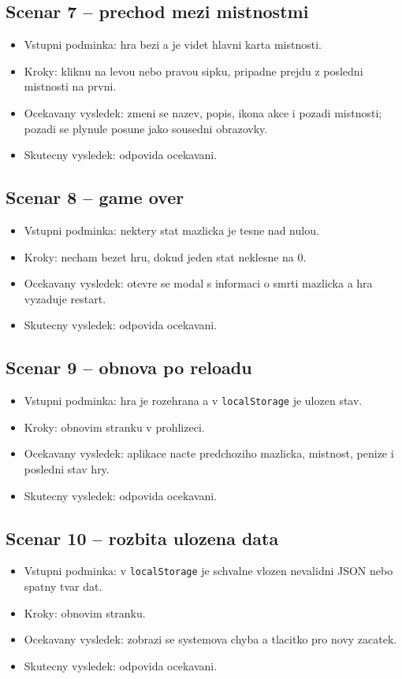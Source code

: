\documentclass[12pt,a4paper]{article}
\begin{document}
\subsection*{Scenar 7 -- prechod mezi mistnostmi}
\begin{itemize}[leftmargin=2em]
  \item Vstupni podminka: hra bezi a je videt hlavni karta mistnosti.
  \item Kroky: kliknu na levou nebo pravou sipku, pripadne prejdu z posledni mistnosti na prvni.
  \item Ocekavany vysledek: zmeni se nazev, popis, ikona akce i pozadi mistnosti; pozadi se plynule posune jako sousedni obrazovky.
  \item Skutecny vysledek: odpovida ocekavani.
\end{itemize}

\subsection*{Scenar 8 -- game over}
\begin{itemize}[leftmargin=2em]
  \item Vstupni podminka: nektery stat mazlicka je tesne nad nulou.
  \item Kroky: necham bezet hru, dokud jeden stat neklesne na 0.
  \item Ocekavany vysledek: otevre se modal s informaci o smrti mazlicka a hra vyzaduje restart.
  \item Skutecny vysledek: odpovida ocekavani.
\end{itemize}

\subsection*{Scenar 9 -- obnova po reloadu}
\begin{itemize}[leftmargin=2em]
  \item Vstupni podminka: hra je rozehrana a v \texttt{localStorage} je ulozen stav.
  \item Kroky: obnovim stranku v prohlizeci.
  \item Ocekavany vysledek: aplikace nacte predchoziho mazlicka, mistnost, penize i posledni stav hry.
  \item Skutecny vysledek: odpovida ocekavani.
\end{itemize}

\subsection*{Scenar 10 -- rozbita ulozena data}
\begin{itemize}[leftmargin=2em]
  \item Vstupni podminka: v \texttt{localStorage} je schvalne vlozen nevalidni JSON nebo spatny tvar dat.
  \item Kroky: obnovim stranku.
  \item Ocekavany vysledek: zobrazi se systemova chyba a tlacitko pro novy zacatek.
  \item Skutecny vysledek: odpovida ocekavani.
\end{itemize}
\end{document}
